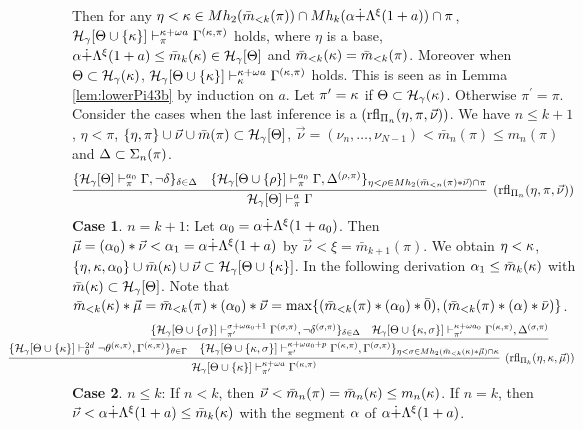 \documentclass{article}
\begin{document}
Then for any $\eta<\kappa\in Mh_{2}(\bar{m}_{<k}(\pi))\cap Mh_{k}(\alpha\dot{+}\Lambda^{\xi}(1+a))\cap \pi$,
${\cal H}_{\gamma}[\Theta\cup \{\kappa\}]\vdash^{\kappa+\omega a}_{\pi}\Gamma^{(\kappa,\pi)}$ holds, where
$\eta$ is a base,
$\alpha\dot{+}\Lambda^{\xi}(1+a)\leq \bar{m}_{k}(\kappa)\in{\cal H}_{\gamma}[\Theta]$ and $\bar{m}_{<k}(\kappa)=\bar{m}_{<k}(\pi)$.
Moreover when $\Theta\subset{\cal H}_{\gamma}(\kappa)$,
${\cal H}_{\gamma}[\Theta\cup \{\kappa\}]\vdash^{\kappa+\omega a}_{\kappa}\Gamma^{(\kappa,\pi)}$ holds.
\elem
\bprf
This is seen as in Lemma \ref{lem:lowerPi43b} by induction on $a$.
Let $\pi^{\prime}=\kappa$ if $\Theta\subset{\cal H}_{\gamma}(\kappa)$. Otherwise $\pi^{\prime}=\pi$.
Consider the cases when the last inference is a $({\rm rfl}_{\Pi_{n}}(\eta,\pi,\vec{\nu}))$.
We have $n\leq k+1$, $\eta<\pi$,
$\{\eta,\pi\}\cup\vec{\nu}\cup\bar{m}(\pi)\subset{\cal H}_{\gamma}[\Theta]$,
$\vec{\nu}=(\nu_{n},\ldots,\nu_{N-1})<\bar{m}_{n}(\pi)\leq m_{n}(\pi)$ and
$\Delta\subset\Sigma_{n}(\pi)$.
{\small
\[
\infer[({\rm rfl}_{\Pi_{n}}(\eta,\pi,\vec{\nu}))]{
\calh_{\gam}[\Tht]\vdash^{a}_{\pi}\Gam}
{
\{
\mathcal{H}_{\gam}[\Tht]\vdash^{a_{0}}_{\pi}\Gamma, \lnot\del
\}_{\del\in\Del}
&
\{
\mathcal{H}_{\gam}[\Tht\cup \{\rho\}]\vdash^{a_{0}}_{\pi}\Gamma, 
\Del^{(\rho,\pi)}\}_{\eta<\rho\in Mh_{2}(\bar{m}_{<n}(\pi)*\vec{\nu})\cap \pi}
}
\]
}
\textbf{Case 1}. $n=k+1$:
Let $\alpha_{0}=\alpha\dot{+}\Lambda^{\xi}(1+a_{0})$. Then $\vec{\mu}=(\alpha_{0})*\vec{\nu}<\alpha_{1}=\alpha\dot{+}\Lambda^{\xi}(1+a)$
by $\vec{\nu}<\xi=\bar{m}_{k+1}(\pi)$.
We obtain $\eta<\kappa$, $\{\eta,\kappa,\alpha_{0}\}\cup\bar{m}(\kappa)\cup\vec{\nu}\subset{\cal H}_{\gamma}[\Theta\cup\{\kappa\}]$.
In the following derivation $\alpha_{1}\leq\bar{m}_{k}(\kappa)$ with $\bar{m}(\kappa)\subset{\cal H}_{\gamma}[\Theta]$.
Note that
$\bar{m}_{<k}(\kappa)*\vec{\mu}=\bar{m}_{<k}(\pi)*(\alpha_{0})*\vec{\nu}=\max\{(\bar{m}_{<k}(\pi)*(\alpha_{0})*\bar{0}), (\bar{m}_{<k}(\pi)*(\alpha)*\bar{\nu})\}$.
{\footnotesize
\[
\hspace{-20mm}
\infer[({\rm rfl}_{\Pi_{k}}(\eta,\kap,\vec{\mu}))]{\mathcal{H}_{\gam}[\Tht\cup \{\kap\}]\vdash^{\kap+\ome a}_{\pi^{\prime}}\Gam^{(\kap,\pi)}}
{
\{\mathcal{H}_{\gam}[\Tht\cup \{\kap\}]\vdash^{2d}_{0}\lnot\tht^{(\kap,\pi)},\Gam^{(\kap,\pi)}\}_{\tht\in\Gam}
&
\hspace{-15mm}
\infer{
\{\mathcal{H}_{\gam}[\Tht\cup \{\kap,\sig\}]\vdash^{\kap+\ome a_{0}+p}_{\pi^{\prime}}\Gamma^{(\kap,\pi)},\Gam^{(\sig,\pi)}\}_{\eta<\sig\in Mh_{2}(\bar{m}_{<k}(\kap)*\vec{\mu})\cap \kap}
}
 {
 \{
 \mathcal{H}_{\gam}[\Tht\cup \{\sig\}]\vdash^{\sig+\ome a_{0}+1}_{\pi^{\prime}}\Gamma^{(\sig,\pi)}, \lnot \del^{(\sig,\pi)}
 \}_{\del\in\Del}
 &
 \mathcal{H}_{\gam}[\Tht\cup \{\kap,\sig\}]\vdash^{\kap+\ome a_{0}}_{\pi^{\prime}}\Gamma^{(\kap,\pi)}, 
\Del^{(\sig,\pi)}
 }
}
\]
}
\textbf{Case 2}. $n\leq k$:
If $n<k$, then $\vec{\nu}<\bar{m}_{n}(\pi)=\bar{m}_{n}(\kappa)\leq m_{n}(\kappa)$.
If $n=k$, then $\vec{\nu}<\alpha\dot{+}\Lambda^{\xi}(1+a)\leq \bar{m}_{k}(\kappa)$
with the segment $\alpha$ of $\alpha\dot{+}\Lambda^{\xi}(1+a)$.
\end{document}
